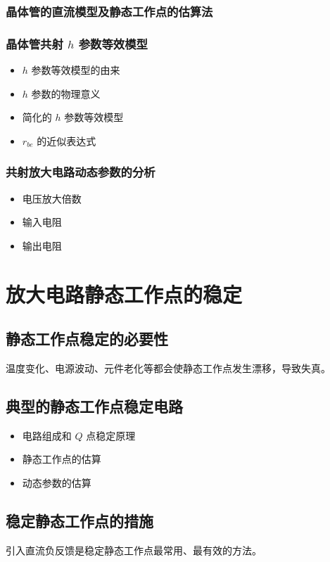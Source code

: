 \subsubsection{晶体管的直流模型及静态工作点的估算法}
\subsubsection{晶体管共射 \(h\) 参数等效模型}
\begin{itemize}
    \item \(h\) 参数等效模型的由来
    \item \(h\) 参数的物理意义
    \item 简化的 \(h\) 参数等效模型
    \item \(r_{be}\) 的近似表达式
\end{itemize}

\subsubsection{共射放大电路动态参数的分析}
\begin{itemize}
    \item 电压放大倍数
    \item 输入电阻
    \item 输出电阻
\end{itemize}

\section{放大电路静态工作点的稳定}
\subsection{静态工作点稳定的必要性}
温度变化、电源波动、元件老化等都会使静态工作点发生漂移，导致失真。

\subsection{典型的静态工作点稳定电路}
\begin{itemize}
    \item 电路组成和 \(Q\) 点稳定原理
    \item 静态工作点的估算
    \item 动态参数的估算
\end{itemize}

\subsection{稳定静态工作点的措施}
引入直流负反馈是稳定静态工作点最常用、最有效的方法。

